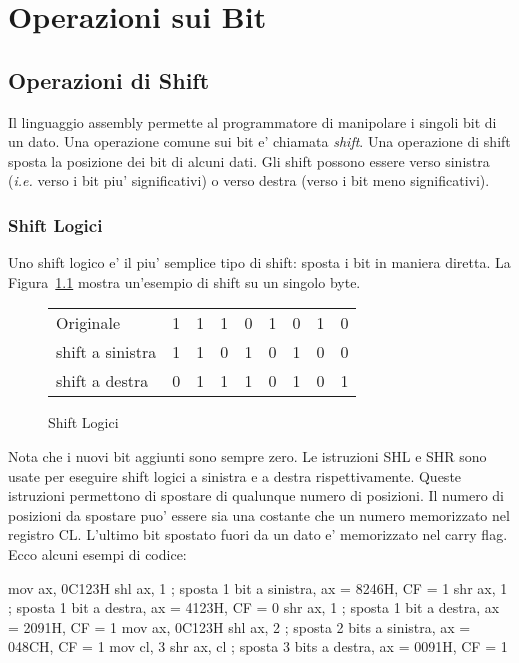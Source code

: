 \chapter{Operazioni sui Bit}
\section{Operazioni di Shift}

Il linguaggio assembly permette al programmatore di manipolare i singoli
bit di un dato. Una operazione comune sui bit e' chiamata \emph{shift}.
Una operazione di shift sposta la posizione dei bit di alcuni dati. Gli
shift possono essere verso sinistra (\emph{i.e.} verso i bit piu' 
significativi) o verso destra (verso i bit meno significativi).

\subsection{Shift Logici}

Uno shift logico e' il piu' semplice tipo di shift: sposta i bit
in maniera diretta. La Figura~\ref{fig:logshifts} mostra un'esempio
di shift su un singolo byte.

\begin{figure}[h]
\centering
\begin{tabular}{l|c|c|c|c|c|c|c|c|}
\cline{2-9}
Originale      & 1 & 1 & 1 & 0 & 1 & 0 & 1 & 0 \\
\cline{2-9}
shift a sinistra  & 1 & 1 & 0 & 1 & 0 & 1 & 0 & 0 \\
\cline{2-9}
shift a destra & 0 & 1 & 1 & 1 & 0 & 1 & 0 & 1 \\
\cline{2-9}
\end{tabular}
\caption{Shift Logici\label{fig:logshifts}}
\end{figure}

Nota che i nuovi bit aggiunti sono sempre zero. Le istruzioni
{\code SHL} e {\code SHR}  sono usate
per eseguire shift logici a sinistra e a destra rispettivamente.
Queste istruzioni permettono di spostare di qualunque numero di
posizioni. Il numero di posizioni da spostare puo' essere sia
una costante che un numero memorizzato nel registro {\code CL}.
L'ultimo bit spostato fuori da un dato e' memorizzato nel carry flag.
Ecco alcuni esempi di codice: 
\begin{AsmCodeListing}[frame=none]
      mov    ax, 0C123H
      shl    ax, 1           ; sposta 1 bit a sinistra,   ax = 8246H, CF = 1
      shr    ax, 1           ; sposta 1 bit a destra,  ax = 4123H, CF = 0
      shr    ax, 1           ; sposta 1 bit a destra,  ax = 2091H, CF = 1
      mov    ax, 0C123H
      shl    ax, 2           ; sposta 2 bits a sinistra,  ax = 048CH, CF = 1
      mov    cl, 3
      shr    ax, cl          ; sposta 3 bits a destra, ax = 0091H, CF = 1
\end{AsmCodeListing}

